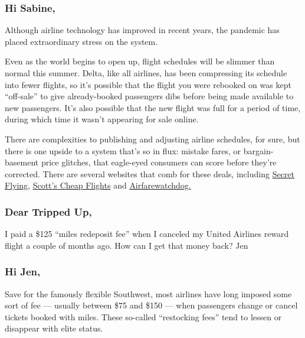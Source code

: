 \hypertarget{hi-sabine}{%
\subsubsection{Hi Sabine,}\label{hi-sabine}}

Although airline technology has improved in recent years, the pandemic
has placed extraordinary stress on the system.

Even as the world begins to open up, flight schedules will be slimmer
than normal this summer. Delta, like all airlines, has been compressing
its schedule into fewer flights, so it's possible that the flight you
were rebooked on was kept ``off-sale'' to give already-booked passengers
dibs before being made available to new passengers. It's also possible
that the new flight was full for a period of time, during which time it
wasn't appearing for sale online.

There are complexities to publishing and adjusting airline schedules,
for sure, but there is one upside to a system that's so in flux: mistake
fares, or bargain-basement price glitches, that eagle-eyed consumers can
score before they're corrected. There are several websites that comb for
these deals, including \href{https://www.secretflying.com/}{Secret
Flying,} \href{https://scottscheapflights.com/}{Scott's Cheap Flights}
and \href{https://www.airfarewatchdog.com/}{Airfarewatchdog.}

\hypertarget{dear-tripped-up-2}{%
\subsubsection{\texorpdfstring{\textbf{Dear Tripped
Up,}}{Dear Tripped Up,}}\label{dear-tripped-up-2}}

I paid a \$125 ``miles redeposit fee'' when I canceled my United
Airlines reward flight a couple of months ago. How can I get that money
back? Jen

\hypertarget{hi-jen}{%
\subsubsection{Hi Jen,}\label{hi-jen}}

Save for the famously flexible Southwest, most airlines have long
imposed some sort of fee --- usually between \$75 and \$150 --- when
passengers change or cancel tickets booked with miles. These so-called
``restocking fees'' tend to lessen or disappear with elite status.

\href{https://www.nytimes.com/news-event/coronavirus?action=click\&pgtype=Article\&state=default\&region=MAIN_CONTENT_3\&context=storylines_faq}{}

